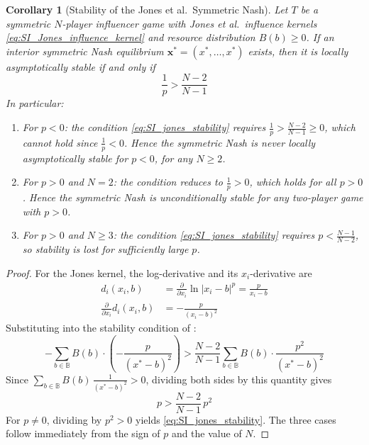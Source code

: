 \documentclass{article}
\newtheorem{corollary}{Corollary}[theorem]
\begin{document}
            \begin{corollary}[Stability of the Jones et al.\ Symmetric Nash]\label{cor:SI_jones_stability}
                Let $T$ be a symmetric $N$-player influencer game with Jones et al.\ influence kernels \cref{eq:SI_Jones_influence_kernel} and resource distribution $B(b) \geq 0$. If an interior symmetric Nash equilibrium $\mathbf{x}^* = (x^*,\ldots,x^*)$ exists, then it is locally asymptotically stable if and only if
                \begin{equation}\label{eq:SI_jones_stability}
                    \frac{1}{p} > \frac{N-2}{N-1}
                \end{equation}
                In particular:
                \begin{enumerate}
                    \item For $p < 0$: the condition \cref{eq:SI_jones_stability} requires $\frac{1}{p} > \frac{N-2}{N-1} \geq 0$, which cannot hold since $\frac{1}{p} < 0$. Hence the symmetric Nash is never locally asymptotically stable for $p < 0$, for any $N \geq 2$.
                    \item For $p > 0$ and $N = 2$: the condition reduces to $\frac{1}{p} > 0$, which holds for all $p > 0$. Hence the symmetric Nash is unconditionally stable for any two-player game with $p > 0$.
                    \item For $p > 0$ and $N \geq 3$: the condition \cref{eq:SI_jones_stability} requires $p < \frac{N-1}{N-2}$, so stability is lost for sufficiently large $p$.
                \end{enumerate}
            \end{corollary}

            \begin{proof}
                For the Jones kernel, the log-derivative and its $x_i$-derivative are
                \begin{align}
                    d_i(x_i, b) &= \frac{\partial}{\partial x_i}\ln|x_i-b|^p = \frac{p}{x_i - b} \label{eq:SI_jones_d}\\
                    \frac{\partial}{\partial x_i}d_i(x_i,b) &= -\frac{p}{(x_i-b)^2} \label{eq:SI_jones_dprime}
                \end{align}
                Substituting into the stability condition of :
                \begin{equation}
                    -\sum_{b\in\mathbb{B}} B(b)\cdot\left(-\frac{p}{(x^*-b)^2}\right) > \frac{N-2}{N-1}\sum_{b\in\mathbb{B}} B(b)\cdot\frac{p^2}{(x^*-b)^2}
                \end{equation}
                Since $\sum_{b\in\mathbb{B}} B(b)\,\frac{1}{(x^*-b)^2} > 0$, dividing both 
                sides by this quantity gives
                \begin{equation}
                    p > \frac{N-2}{N-1}\,p^2
                \end{equation}
                For $p \neq 0$, dividing by $p^2 > 0$ yields \cref{eq:SI_jones_stability}. The three cases follow immediately from the sign of $p$ and the value of $N$.
            \end{proof}
\end{document}
